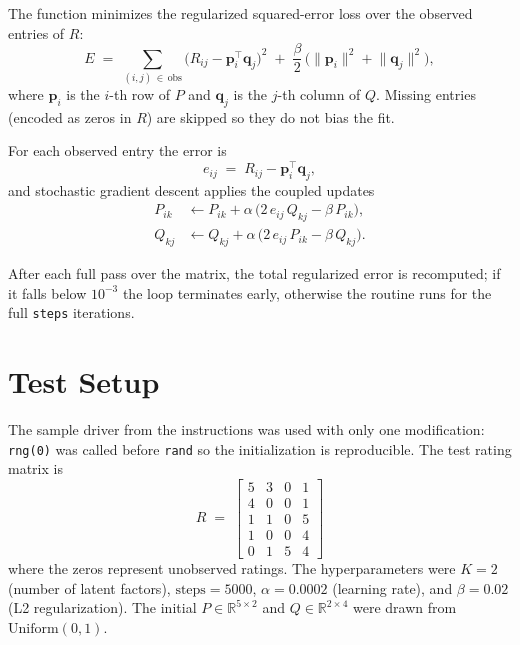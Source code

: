 \documentclass[12pt]{article}
\begin{document}
	The function minimizes the regularized squared-error loss over the observed entries of $R$:
	\begin{equation}
		E \;=\; \sum_{(i,j)\,\in\,\text{obs}} \Big( R_{ij} - \mathbf{p}_i^{\top}\mathbf{q}_j \Big)^{2}
		\;+\; \frac{\beta}{2}\,\Big( \lVert \mathbf{p}_i \rVert^{2} + \lVert \mathbf{q}_j \rVert^{2} \Big),
	\end{equation}
	where $\mathbf{p}_i$ is the $i$-th row of $P$ and $\mathbf{q}_j$ is the $j$-th column of $Q$. Missing entries (encoded as zeros in $R$) are skipped so they do not bias the fit.

	For each observed entry the error is
	\begin{equation}
		e_{ij} \;=\; R_{ij} - \mathbf{p}_i^{\top}\mathbf{q}_j,
	\end{equation}
	and stochastic gradient descent applies the coupled updates
	\begin{align}
		P_{ik} &\leftarrow P_{ik} + \alpha\,\bigl(2\,e_{ij}\,Q_{kj} - \beta\,P_{ik}\bigr), \\
		Q_{kj} &\leftarrow Q_{kj} + \alpha\,\bigl(2\,e_{ij}\,P_{ik} - \beta\,Q_{kj}\bigr).
	\end{align}

	After each full pass over the matrix, the total regularized error is recomputed; if it falls below $10^{-3}$ the loop terminates early, otherwise the routine runs for the full \texttt{steps} iterations.

	\newpage
	\section{Test Setup}\label{sec:test}

	The sample driver from the instructions was used with only one modification: \texttt{rng(0)} was called before \texttt{rand} so the initialization is reproducible. The test rating matrix is
	\begin{equation}
		R \;=\;
		\begin{bmatrix}
			5 & 3 & 0 & 1 \\
			4 & 0 & 0 & 1 \\
			1 & 1 & 0 & 5 \\
			1 & 0 & 0 & 4 \\
			0 & 1 & 5 & 4
		\end{bmatrix}
	\end{equation}
	where the zeros represent unobserved ratings. The hyperparameters were $K = 2$ (number of latent factors), $\text{steps} = 5000$, $\alpha = 0.0002$ (learning rate), and $\beta = 0.02$ (L2 regularization). The initial $P\in\mathbb{R}^{5\times 2}$ and $Q\in\mathbb{R}^{2\times 4}$ were drawn from $\mathrm{Uniform}(0,1)$.
\end{document}
